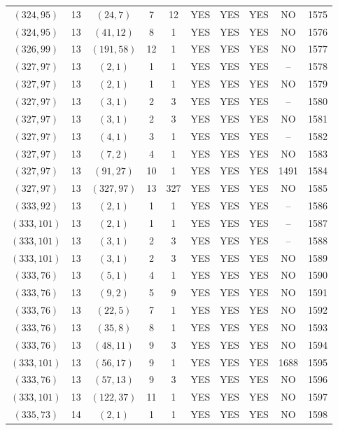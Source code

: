 \begin{longtable}{|c|c|c|c|c|c|c|c|c|c|}
$(324, 95)$ & 13 & $(24, 7)$ & 7 & 12 & YES & YES & YES & NO & 1575\\
$(324, 95)$ & 13 & $(41, 12)$ & 8 & 1 & YES & YES & YES & NO & 1576\\
$(326, 99)$ & 13 & $(191, 58)$ & 12 & 1 & YES & YES & YES & NO & 1577\\
$(327, 97)$ & 13 & $(2, 1)$ & 1 & 1 & YES & YES & YES & -- & 1578\\
$(327, 97)$ & 13 & $(2, 1)$ & 1 & 1 & YES & YES & YES & NO & 1579\\
$(327, 97)$ & 13 & $(3, 1)$ & 2 & 3 & YES & YES & YES & -- & 1580\\
$(327, 97)$ & 13 & $(3, 1)$ & 2 & 3 & YES & YES & YES & NO & 1581\\
$(327, 97)$ & 13 & $(4, 1)$ & 3 & 1 & YES & YES & YES & -- & 1582\\
$(327, 97)$ & 13 & $(7, 2)$ & 4 & 1 & YES & YES & YES & NO & 1583\\
$(327, 97)$ & 13 & $(91, 27)$ & 10 & 1 & YES & YES & YES & 1491 & 1584\\
$(327, 97)$ & 13 & $(327, 97)$ & 13 & 327 & YES & YES & YES & NO & 1585\\
$(333, 92)$ & 13 & $(2, 1)$ & 1 & 1 & YES & YES & YES & -- & 1586\\
$(333, 101)$ & 13 & $(2, 1)$ & 1 & 1 & YES & YES & YES & -- & 1587\\
$(333, 101)$ & 13 & $(3, 1)$ & 2 & 3 & YES & YES & YES & -- & 1588\\
$(333, 101)$ & 13 & $(3, 1)$ & 2 & 3 & YES & YES & YES & NO & 1589\\
$(333, 76)$ & 13 & $(5, 1)$ & 4 & 1 & YES & YES & YES & NO & 1590\\
$(333, 76)$ & 13 & $(9, 2)$ & 5 & 9 & YES & YES & YES & NO & 1591\\
$(333, 76)$ & 13 & $(22, 5)$ & 7 & 1 & YES & YES & YES & NO & 1592\\
$(333, 76)$ & 13 & $(35, 8)$ & 8 & 1 & YES & YES & YES & NO & 1593\\
$(333, 76)$ & 13 & $(48, 11)$ & 9 & 3 & YES & YES & YES & NO & 1594\\
$(333, 101)$ & 13 & $(56, 17)$ & 9 & 1 & YES & YES & YES & 1688 & 1595\\
$(333, 76)$ & 13 & $(57, 13)$ & 9 & 3 & YES & YES & YES & NO & 1596\\
$(333, 101)$ & 13 & $(122, 37)$ & 11 & 1 & YES & YES & YES & NO & 1597\\
$(335, 73)$ & 14 & $(2, 1)$ & 1 & 1 & YES & YES & YES & NO & 1598\\

\end{longtable}
